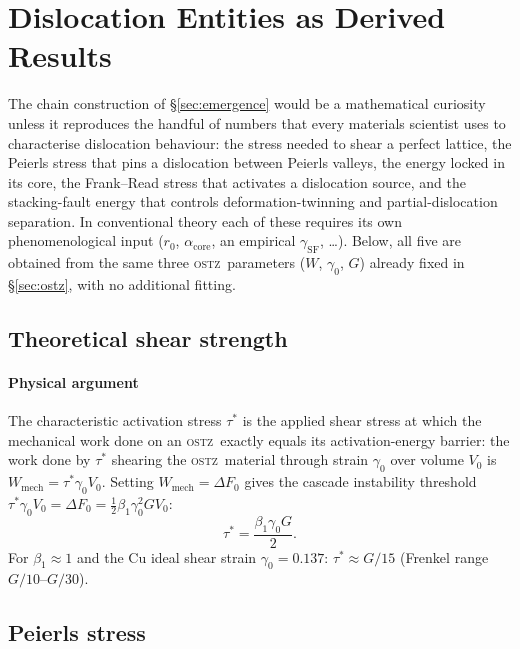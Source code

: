 \documentclass[3p]{elsarticle}
\newcommand{\OSTZ}{\textsc{ostz}}
\newcommand{\dF}{\Delta F_0}
\newcommand{\gz}{\gamma_0}
\newcommand{\half}{\tfrac{1}{2}}
\begin{document}
\section{Dislocation Entities as Derived Results}
\label{sec:derived}

The chain construction of \S\ref{sec:emergence} would be a
mathematical curiosity unless it reproduces the handful of numbers
that every materials scientist uses to characterise dislocation
behaviour: the stress needed to shear a perfect lattice, the
Peierls stress that pins a dislocation between Peierls valleys, the
energy locked in its core, the Frank--Read stress that activates a
dislocation source, and the stacking-fault energy that controls
deformation-twinning and partial-dislocation separation. In
conventional theory each of these requires its own phenomenological
input ($r_0$, $\alpha_\text{core}$, an empirical $\gamma_\text{SF}$,
\ldots). Below, all five are obtained from the same three \OSTZ\
parameters ($W$, $\gz$, $G$) already fixed in \S\ref{sec:ostz},
with no additional fitting.

\subsection{Theoretical shear strength}
\label{sec:strength}

\paragraph{Physical argument} The characteristic activation stress
$\tau^*$ is the applied shear stress at which the mechanical work
done on an \OSTZ\ exactly equals its activation-energy barrier: the
work done by $\tau^*$ shearing the \OSTZ\ material through strain
$\gz$ over volume $V_0$ is $W_\mathrm{mech}=\tau^*\gz V_0$. Setting
$W_\mathrm{mech}=\dF$ gives the cascade instability threshold
$\tau^*\gz V_0=\dF=\half\beta_1\gz^2GV_0$:
\begin{equation}
  \boxed{\tau^*=\frac{\beta_1\gz G}{2}.}
  \label{eq:strength}
\end{equation}
For $\beta_1\approx1$ and the Cu ideal shear strain $\gz=0.137$:
$\tau^*\approx G/15$ (Frenkel range~\citep{frenkel1926} $G/10$--$G/30$).

\subsection{Peierls stress}
\label{sec:peierls}
\end{document}

